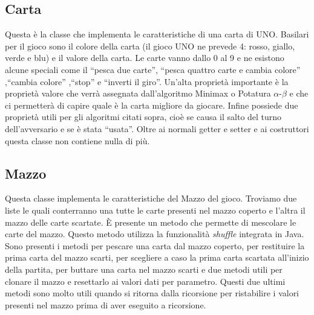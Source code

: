 	\subsection{Carta}
		Questa è la classe che implementa le caratteristiche di una carta di UNO. Basilari per il gioco sono il colore della carta (il gioco UNO ne prevede 4: rosso, giallo, verde e blu) e il valore della carta. Le carte vanno dallo 0 al 9 e ne esistono alcune speciali come il ``pesca due carte'', ``pesca quattro carte e cambia colore'' ,``cambia colore'' ,``stop'' e ``inverti il giro''. Un'alta proprietà importante è la proprietà valore che verrà assegnata dall'algoritmo Minimax o Potatura $\alpha$-$\beta$ e che ci permetterà di capire quale è la carta migliore da giocare. Infine possiede due proprietà utili per gli algoritmi citati sopra, cioè se causa il salto del turno dell'avversario e se è stata ``usata''. Oltre ai normali getter e setter e ai costruttori questa classe non contiene nulla di più.
		
	\subsection{Mazzo}
		Questa classe implementa le caratteristiche del Mazzo del gioco. Troviamo due liste le quali conterranno una tutte le carte presenti nel mazzo coperto e l'altra il mazzo delle carte scartate. È presente un metodo che permette di mescolare le carte del mazzo. Questo metodo utilizza la funzionalità \textit{shuffle} integrata in Java. Sono presenti i metodi per pescare una carta dal mazzo coperto, per restituire la prima carta del mazzo scarti, per scegliere a caso la prima carta scartata all'inizio della partita, per buttare una carta nel mazzo scarti e due metodi utili per clonare il mazzo e resettarlo ai valori dati per parametro. Questi due ultimi metodi sono molto utili quando si ritorna dalla ricorsione per ristabilire i valori presenti nel mazzo prima di aver eseguito a ricorsione.
		
